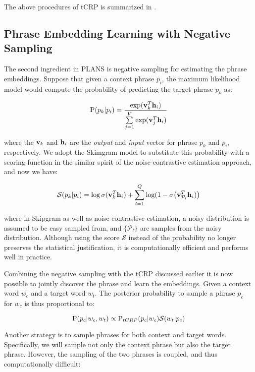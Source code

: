 The above procedures of tCRP is summarized in .

\subsection{Phrase Embedding Learning with Negative Sampling}

The second ingredient in PLANS is negative sampling for estimating the phrase
embeddings. Suppose that given a context phrase $p_i$,
the maximum likelihood model would compute the probability of predicting the
target phrase $p_k$ as:

\begin{equation}
  \P(p_k | p_i) =
    \frac{\exp(\vv_k^T \vh_i)}{\sum\limits_{j=1}^V \exp(\vv_j^T \vh_i)}
\end{equation}

where the $\vv_k$ and $\vh_i$ are the \emph{output} and \emph{input} vector for
phrase $p_k$ and $p_i$, respectively.  We adopt the Skimgram model to substitute
this probability with a scoring function in the similar spirit of the
noise-contrastive estimation approach, and now we have:

\begin{equation}
  \mathcal{S}(p_k | p_i) =
  \log\sigma(\vv_k^T \vh_i) +
  \sum\limits_{l=1}^Q \log(1 - \sigma\big(\vv_{\mathcal{P}_l}^T \vh_i)\big)
\end{equation}

where in Skipgram as well as noise-contrastive estimation, a noisy distribution
is assumed to be easy sampled from, and $\{\mathcal{P}_l\}$ are samples from the
noisy distribution. Although using the score $\mathcal{S}$ instead of the
probability no longer preserves the statistical justification, it is
computationally efficient and performs well in practice.

Combining the negative sampling with the tCRP discussed earlier it is now
possible to jointly discover the phrase and learn the embeddings. Given a
context word $w_c$ and a target word $w_t$. The posterior probability to sample
a phrase $p_c$ for $w_c$ is thus proportional to:

\begin{equation}
  \P(p_c | w_c, w_t) \propto \P_{tCRP}(p_c | w_c) \mathcal{S}(w_t | p_c)
\end{equation}

Another strategy is to sample phrases for both context and target words.
Specifically, we will sample not only the context phrase but also the target
phrase. However, the sampling of the two phrases is coupled, and thus
computationally difficult:

